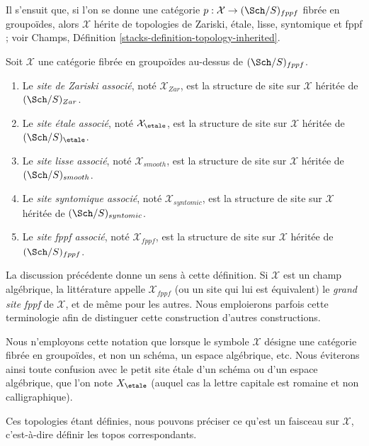 \medskip\noindent
Il s'ensuit que, si l'on se donne une catégorie
$p : \mathcal{X} \to (\Sch/S)_{fppf}$ fibrée en groupoïdes, alors
$\mathcal{X}$ hérite de topologies de Zariski, \'etale, lisse, syntomique et
fppf ; voir
Champs, Définition \ref{stacks-definition-topology-inherited}.

\begin{definition}
\label{definition-inherited-topologies}
Soit $\mathcal{X}$ une catégorie fibrée en groupoïdes au-dessus de
$(\Sch/S)_{fppf}$.
\begin{enumerate}
\item Le {\it site de Zariski associé}, noté $\mathcal{X}_{Zar}$,
est la structure de site sur $\mathcal{X}$ héritée de
$(\Sch/S)_{Zar}$.
\item Le {\it site \'etale associé}, noté $\mathcal{X}_\etale$,
est la structure de site sur $\mathcal{X}$ héritée de
$(\Sch/S)_\etale$.
\item Le {\it site lisse associé}, noté $\mathcal{X}_{smooth}$,
est la structure de site sur $\mathcal{X}$ héritée de
$(\Sch/S)_{smooth}$.
\item Le {\it site syntomique associé}, noté $\mathcal{X}_{syntomic}$,
est la structure de site sur $\mathcal{X}$ héritée de
$(\Sch/S)_{syntomic}$.
\item Le {\it site fppf associé}, noté $\mathcal{X}_{fppf}$,
est la structure de site sur $\mathcal{X}$ héritée de
$(\Sch/S)_{fppf}$.
\end{enumerate}
\end{definition}

\noindent
La discussion précédente donne un sens à cette définition. Si $\mathcal{X}$
est un champ algébrique, la littérature appelle $\mathcal{X}_{fppf}$ (ou un
site qui lui est équivalent) le {\it grand site fppf} de $\mathcal{X}$, et de même
pour les autres. Nous emploierons parfois cette terminologie afin de
distinguer cette construction d'autres constructions.

\begin{remark}
\label{remark-ambiguity}
Nous n'employons cette notation que lorsque le symbole $\mathcal{X}$ désigne une
catégorie fibrée en groupoïdes, et non un schéma, un espace algébrique, etc.
Nous éviterons ainsi toute confusion avec le petit site \'etale d'un
schéma ou d'un espace algébrique, que l'on note $X_\etale$ (auquel cas
la lettre capitale est romaine et non calligraphique).
\end{remark}

\noindent
Ces topologies étant définies, nous pouvons préciser ce qu'est
un faisceau sur $\mathcal{X}$, c'est-à-dire définir les topos correspondants.

